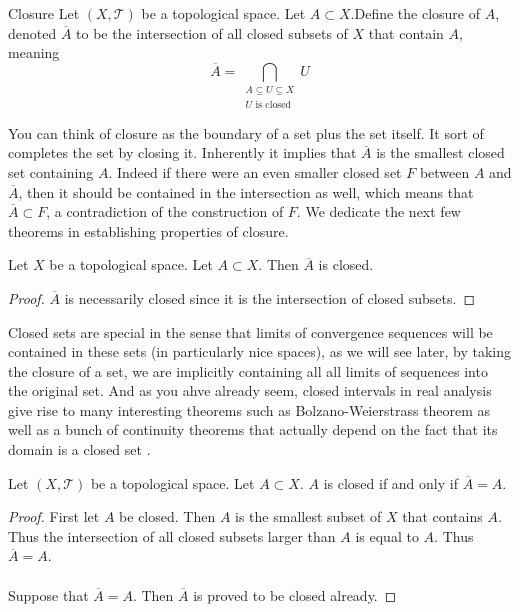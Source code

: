 \documentclass[a4paper]{article}
\begin{document}
\begin{defn}{Closure}{} Let $(X,\mathcal{T})$ be a topological space. Let $A\subset X$.Define the closure of $A$, denoted $\overline{A}$ to be the intersection of all closed subsets of $X$ that contain $A$, meaning $$\overline{A}=\bigcap_{\substack{A\subseteq U\subseteq X\\U\text{ is closed}}}U$$
\end{defn}

You can think of closure as the boundary of a set plus the set itself.  It sort of completes the set by closing it. Inherently it implies that $\overline{A}$ is the smallest closed set containing $A$. Indeed if there were an even smaller closed set $F$ between $A$ and $\overline{A}$, then it should be contained in the intersection as well, which means that $\overline{A}\subset F$, a contradiction of the construction of $F$. We dedicate the next few theorems in establishing properties of closure. 

\begin{lmm}{}{} Let $X$ be a topological space. Let $A\subset X$. Then $\overline{A}$ is closed. \tcbline
\begin{proof}
$\overline{A}$ is necessarily closed since it is the intersection of closed subsets. 
\end{proof}
\end{lmm}

Closed sets are special in the sense that limits of convergence sequences will be contained in these sets (in particularly nice spaces), as we will see later, by taking the closure of a set, we are implicitly containing all all limits of sequences into the original set. And as you ahve already seem, closed intervals in real analysis give rise to many interesting theorems such as Bolzano-Weierstrass theorem as well as a bunch of continuity theorems that actually depend on the fact that its domain is a closed set . 

\begin{prp}{}{} Let $(X,\mathcal{T})$ be a topological space. Let $A\subset X$. $A$ is closed if and only if $\overline{A}=A$. \tcbline
\begin{proof}
First let $A$ be closed. Then $A$ is the smallest subset of $X$ that contains $A$. Thus the intersection of all closed subsets larger than $A$ is equal to $A$. Thus $\overline{A}=A$. \\~\\
Suppose that $\overline{A}=A$. Then $\overline{A}$ is proved to be closed already. 
\end{proof}
\end{prp}
\end{document}
